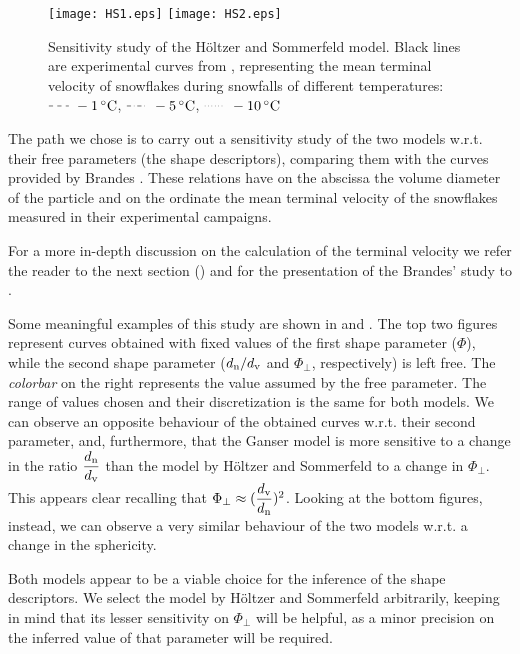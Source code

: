 		\begin{figure}
			\centering
			\texttt{[image: HS1.eps]}
			\texttt{[image: HS2.eps]}
			\caption[Sensitivity study of the H\"oltzer and Sommerfeld model.]{Sensitivity study of the H\"oltzer and Sommerfeld model. Black lines are experimental curves from \cite{BrandesIkedEtAl-2008}, representing the mean terminal velocity of snowflakes during snowfalls of different temperatures: 
				$ \tikz[baseline] {\draw[dashed] (0,.7ex)--(.5,.7ex) ;} ~\SI{-1}{\celsius} $,
				$ \tikz[baseline] {\draw[dash dot] (0,.7ex)--(.5,.7ex) ;} ~\SI{-5}{\celsius} $,
				$ \tikz[baseline] {\draw[dotted] (0,.7ex)--(.5,.7ex) ;} ~\SI{-10}{\celsius} $}
			\label{fig: sensitivityHS}
		\end{figure}	
		
		The path we chose is to carry out a sensitivity study of the two models w.r.t. their free parameters (the shape descriptors), comparing them with the curves provided by Brandes \cite{BrandesIkedEtAl-2008}. These relations have on the abscissa the volume diameter of the particle and on the ordinate the mean terminal velocity of the snowflakes measured in their experimental campaigns. 
	
		For a more in-depth discussion on the calculation of the terminal velocity we refer the reader to the next section () and for the presentation of the Brandes' study to . 
	
		Some meaningful examples of this study are shown in  and . The top two figures represent curves obtained with fixed values of the first shape parameter ($ \Phi $), while the second shape parameter ($ d_{\textup{n}} / d_{\textup{v}} $ and $ \Phi_{\perp} $, respectively) is left free. The \textit{colorbar} on the right represents the value assumed by the free parameter. The range of values chosen and their discretization is the same for both models. We can observe an opposite behaviour of the obtained curves w.r.t. their second parameter, and, furthermore, that the Ganser model is more sensitive to a change in the ratio $ \dfrac{d_{\textup{n}}}{d_{\textup{v}}} $ than the model by H\"oltzer and Sommerfeld to a change in $ \Phi_{\perp} $. This appears clear recalling that $ \Phi_{\perp} \approx (\dfrac{d_{\textup{v}}}{d_{\textup{n}}})^2 $.
		Looking at the bottom figures, instead, we can observe a very similar behaviour of the two models w.r.t. a change in the sphericity.
		
		Both models appear to be a viable choice for the inference of the shape descriptors. We select the model by H\"oltzer and Sommerfeld arbitrarily, keeping in mind that its lesser sensitivity on $ \Phi_{\perp} $ will be helpful, as a minor precision on the inferred value of that parameter will be required.
		
